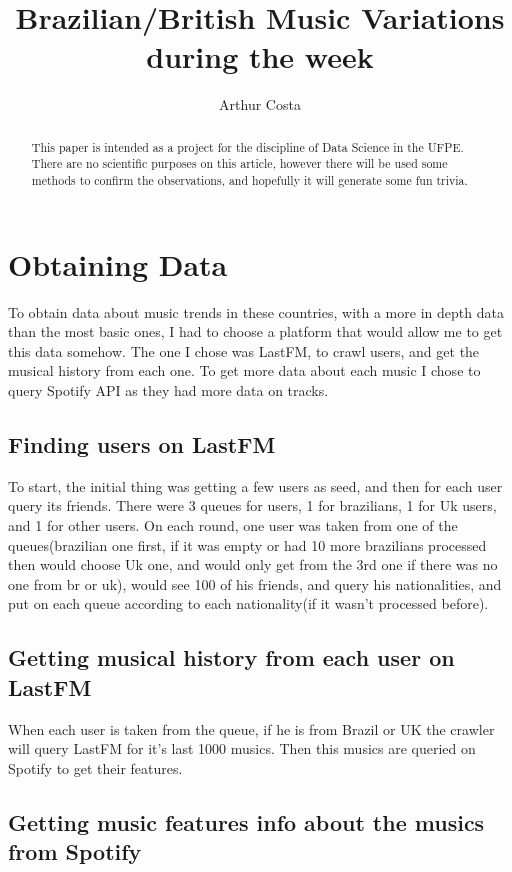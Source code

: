 \documentclass[a4paper]{article}
\title{Brazilian/British Music Variations during the week}
\author{Arthur Costa}
\begin{document}
\maketitle

\begin{abstract}
This paper is intended as a project for the discipline of Data Science in the UFPE. There are no scientific purposes on this article, however there will be used some methods to confirm the observations, and hopefully it will generate some fun trivia.
\end{abstract}

\section{Obtaining Data}

To obtain data about music trends in these countries, with a more in depth data than the most basic ones, I had to choose a platform that would allow me to get this data somehow. The one I chose was LastFM, to crawl users, and get the musical history from each one. To get more data about each music I chose to query Spotify API as they had more data on tracks.

\subsection{Finding users on LastFM}

To start, the initial thing was getting a few users as seed, and then for each user query its friends. There were 3 queues for users, 1 for brazilians, 1 for Uk users, and 1 for other users. On each round, one user was taken from one of the queues(brazilian one first, if it was empty or had 10 more brazilians processed then would choose Uk one, and would only get from the 3rd one if there was no one from br or uk), would see 100 of his friends, and query his nationalities, and put on each queue according to each nationality(if it wasn't processed before).

\subsection{Getting musical history from each user on LastFM}

When each user is taken from the queue, if he is from Brazil or UK the crawler will query LastFM for it's last 1000 musics. Then this musics are queried on Spotify to get their features.

\subsection{Getting music features info about the musics from Spotify}
\end{document}
